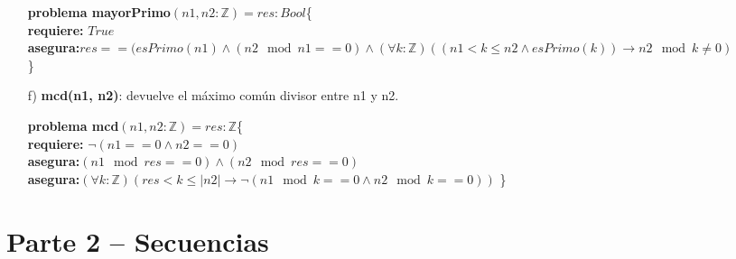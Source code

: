 \documentclass[10pt,a4paper]{article}
\begin{document}
\begin{enumerate}
\textbf{problema mayorPrimo}$(n1,n2 : \mathbb{Z})=res:Bool$\{ \\
	\textbf{  requiere:} $True$\\
	\textbf{  asegura:}$res== (esPrimo(n1)\wedge (n2 \mod n1 ==0) \wedge (\forall k: \mathbb{Z})((n1<k\leq n2 \wedge esPrimo(k))\rightarrow n2 \mod k \not = 0)$\\
	\}

\item[f)]\textbf{mcd(n1, n2)}: devuelve el máximo común divisor entre n1 y n2.

\textbf{problema mcd}$(n1,n2 : \mathbb{Z})=res:\mathbb{Z}$\{ \\
	\textbf{  requiere:} $\neg(n1==0 \wedge n2==0)$\\
	\textbf{  asegura:}$(n1 \mod res ==0) \wedge (n2 \mod res==0)$\\
	\textbf{asegura:}$(\forall k:\mathbb{Z})(res<k\leq |n2|\rightarrow \neg(n1 \mod k == 0 \wedge n2\mod k ==0))$
	\}
\end{enumerate}

\section*{Parte 2 – Secuencias}
\end{document}
